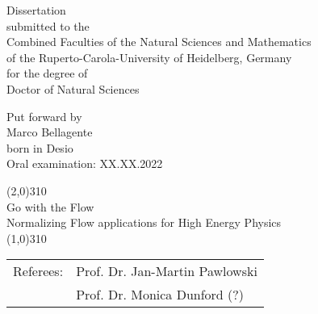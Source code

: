 \thispagestyle{empty}
\mbox{}
\vspace*{5mm}
\begin{center}
\sffamily
\large
Dissertation\\[1.5mm]
submitted to the\\[1.5mm] 
Combined Faculties of the Natural Sciences and Mathematics\\[1.5mm]
of the Ruperto-Carola-University of Heidelberg, Germany \\[1.5mm]
for the degree of \\[1.5mm]
Doctor of Natural Sciences


\vfill
{
\normalsize
Put forward by\\[1.5mm]
Marco Bellagente\\
born in Desio\\
Oral examination: XX.XX.2022
}
\end{center}
\clearpage{\pagestyle{empty}\cleardoublepage}

\newpage
\thispagestyle{empty}
\mbox{}
\vspace*{3cm}
\sffamily
\begin{center}
\line(2,0){310}\\[3mm]
\Huge{Go with the Flow}\\[2mm]
\Large{Normalizing Flow applications for High Energy Physics}\\[3mm]
\line(1,0){310}
\end{center}


\vfill
\begin{tabular}{ll}
Referees: &  Prof. Dr. Jan-Martin Pawlowski\\[2mm]
               &  Prof. Dr. Monica Dunford (?)\\
\end{tabular}

\rmfamily

\newpage
